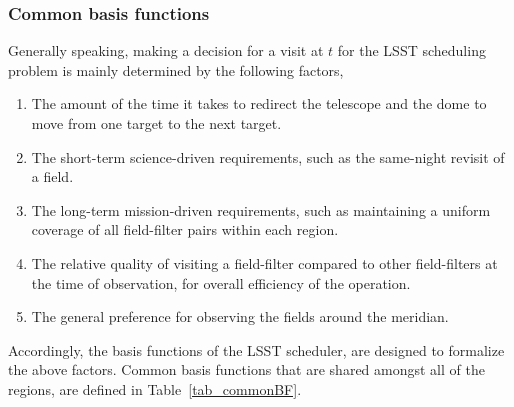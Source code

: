 \documentclass[11pt]{article}
\theoremstyle{definition}
\begin{document}
\subsubsection{Common basis functions}
Generally speaking, making a decision for a visit at $t$ for the LSST scheduling problem is mainly determined by the following factors,
\begin{enumerate}
\item The amount of the time it takes to redirect the telescope and the dome to move from one target to the next target.
\item The short-term science-driven requirements, such as the same-night revisit of a field.
\item The long-term mission-driven requirements, such as maintaining a uniform coverage of all field-filter pairs within each region.
\item The relative quality of visiting a field-filter compared to other field-filters at the time of observation, for overall efficiency of the operation.
\item The general preference for observing the fields around the meridian.
\end{enumerate}
Accordingly, the basis functions of the LSST scheduler, are designed to formalize the above factors. Common basis functions that are shared amongst all of the regions, are defined in Table~\ref{tab_commonBF}.
\end{document}
